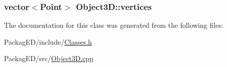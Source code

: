 \subsubsection[{\texorpdfstring{vertices}{vertices}}]{\setlength{\rightskip}{0pt plus 5cm}vector$<${\bf Point}$>$ Object3\+D\+::vertices}\hypertarget{class_object3_d_a225a5c970a1d3d343fc495764ccc3cfd}{}\label{class_object3_d_a225a5c970a1d3d343fc495764ccc3cfd}


The documentation for this class was generated from the following files\+:\begin{DoxyCompactItemize}
\item 
Packag\+E\+D/include/\hyperlink{_classes_8h}{Classes.\+h}\item 
Packag\+E\+D/src/\hyperlink{_object3_d_8cpp}{Object3\+D.\+cpp}\end{DoxyCompactItemize}
